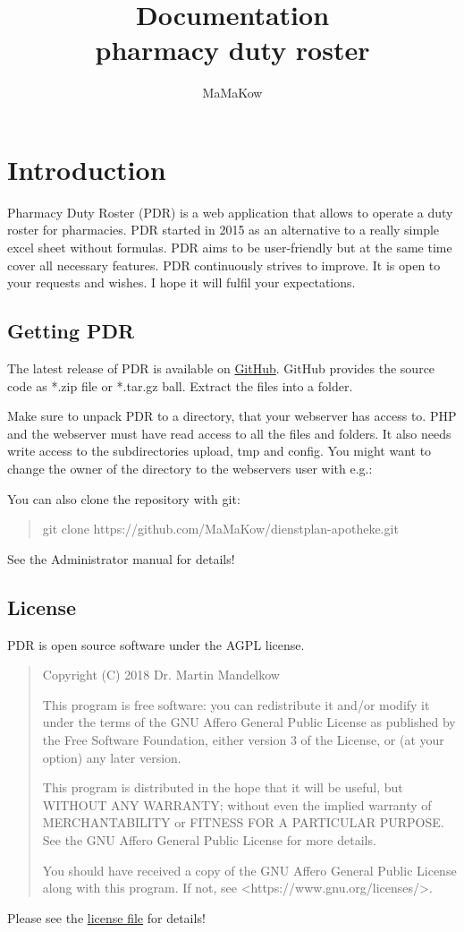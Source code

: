 \documentclass[12pt,a4paper,titlepage]{report}
\author{MaMaKow}
\title{Documentation \\pharmacy duty roster}
\begin{document}
\maketitle
\tableofcontents


\chapter{Introduction}
Pharmacy Duty Roster (PDR) is a web application that allows to operate a duty roster for pharmacies.
PDR started in 2015 as an alternative to a really simple excel sheet without formulas.
PDR aims to be user-friendly but at the same time cover all necessary features.
PDR continuously strives to improve. It is open to your requests and wishes.
I hope it will fulfil your expectations.
\section{Getting PDR}
The latest release of PDR is available on \href{https://github.com/MaMaKow/dienstplan-apotheke/releases/latest}{GitHub}. GitHub provides the source code as *.zip file or *.tar.gz ball. Extract the files into a folder.

Make sure to unpack PDR to a directory, that your webserver has access to. PHP and the webserver must have read access to all the files and folders. It also needs write access to the subdirectories upload, tmp and config. You might want to change the owner of the directory to the webservers user with e.g.:

You can also clone the repository with git:
\begin{verse}
git clone https://github.com/MaMaKow/dienstplan-apotheke.git
\end{verse}
See the Administrator manual for details!

\section{License}
PDR is open source software under the AGPL license.
\begin{quote}
	Copyright (C) 2018  Dr. Martin Mandelkow
	
	This program is free software: you can redistribute it and/or modify
	it under the terms of the GNU Affero General Public License as
	published by the Free Software Foundation, either version 3 of the
	License, or (at your option) any later version.
	
	This program is distributed in the hope that it will be useful,
	but WITHOUT ANY WARRANTY; without even the implied warranty of
	MERCHANTABILITY or FITNESS FOR A PARTICULAR PURPOSE.  See the
	GNU Affero General Public License for more details.
	
	You should have received a copy of the GNU Affero General Public License
	along with this program.  If not, see <https://www.gnu.org/licenses/>.
	
\end{quote}
 Please see the \href{https://github.com/MaMaKow/dienstplan-apotheke/blob/master/LICENSE.md}{license file} for details!
\end{document}
